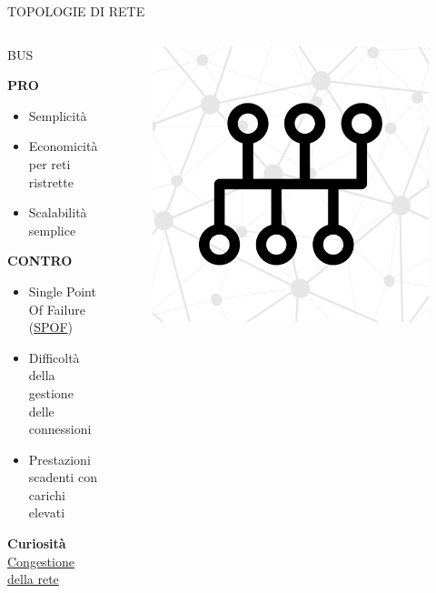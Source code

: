 \documentclass[aspectratio=1610,handout]{beamer}
\begin{document}
\begin{frame}{TOPOLOGIE DI RETE}
    \begin{columns}
            \justifying
            \begin{alertblock}{BUS}
                \begin{minipage}{0.96\linewidth}
                    \justifying
                    \textbf{PRO}
                    \begin{itemize}
                        \item Semplicità
                        \pause
                        \item Economicità per reti ristrette
                        \pause
                        \item Scalabilità semplice
                    \end{itemize}
                    \pause
                    \textbf{CONTRO}
                    \begin{itemize}
                        \item Single Point Of Failure (\href{https://it.wikipedia.org/wiki/Single_point_of_failure}{SPOF})
                        \pause
                        \item Difficoltà della gestione delle connessioni
                        \pause
                        \item Prestazioni scadenti con carichi elevati
                    \end{itemize}
                    \tiny{\textbf{Curiosità}}\\
                    \tiny{\href{https://www.fastweb.it/fastweb-plus/digital-magazine/congestione-della-rete-cosa-fare/}{Congestione della rete}}
                \end{minipage}
            \end{alertblock}
            \begin{figure}
                \includegraphics[width=\linewidth]{img/bus.png}

\end{figure}
\end{columns}
\end{frame}
\end{document}

